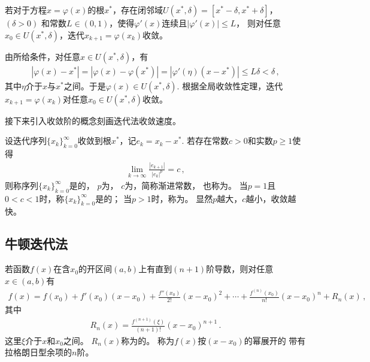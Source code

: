 \begin{theorem}[局部收敛性定理]
    若对于方程$x=\varphi(x)$的根$x^*$，存在闭邻域$U(x^*,\delta)=[x^*-\delta,x^*+\delta]$，$(\delta>0)$
    和常数$L\in(0,1)$，使得$\varphi'(x)$连续且$|\varphi'(x)|\le L$，
    则对任意$x_0\in U(x^*,\delta)$，迭代$x_{k+1}=\varphi(x_k)$收敛。
\end{theorem}
\begin{prove}
    由所给条件，对任意$x\in U(x^*,\delta)$，有
    \begin{align}\label{eq:02ex0323}
        |\varphi(x)-x^*|=|\varphi(x)-\varphi(x^*)|=|\varphi'(\eta)(x-x^*)|\le L\delta<\delta\, ,
    \end{align}
    其中$\eta$介于$x$与$x^*$之间。于是$\varphi(x)\in U(x^*,\delta)$.
    根据全局收敛性定理，迭代$x_{k+1}=\varphi(x_k)$对任意$x_0\in U(x^*,\delta)$收敛。
\end{prove}

接下来引入收敛阶的概念刻画迭代法收敛速度。
\begin{definition}
    设迭代序列$\{x_k\}_{k=0}^\infty$收敛到根$x^*$，记$e_k=x_k-x^*$.
    若存在常数$c>0$和实数$p\ge1$使得
    \begin{align}\label{eq:02ex0324}
        \lim\limits_{k\rightarrow\infty}{\frac{|e_{k+1}|}{|e_k|^p}}=c\, ,
    \end{align}
    则称序列$\{x_k\}_{k=0}^\infty$是的，
    $p$为，
    $c$为，简称渐进常数，
    也称为。
    当$p=1$且$0<c<1$时，称$\{x_k\}_{k=0}^\infty$是的；
    当$p>1$时，称为。
    显然$p$越大，$c$越小，收敛越快。
\end{definition}

\subsection{牛顿迭代法}\label{sub:牛顿迭代法}
\begin{theorem}
    若函数$f(x)$在含$x_0$的开区间$(a,b)$上有直到$(n+1)$阶导数，则对任意$x\in(a,b)$有
    \begin{align}\label{eq:02ex0325.1}
        f(x)=f(x_0)+f'(x_0)(x-x_0)+\frac{f''(x_0)}{2!}(x-x_0)^2+\cdots+\frac{f^{(n)}(x_0)}{n!}(x-x_0)^n+R_n(x)\, ,
    \end{align}
    其中
    \begin{align}\label{eq:02ex0325.2}
        R_n(x)=\frac{f^{(n+1)}(\xi)}{(n+1)!}(x-x_0)^{n+1}\, .
    \end{align}
    这里$\xi$介于$x$和$x_0$之间。
    $R_n(x)$称为的。
    称为$f(x)$按$(x-x_0)$的幂展开的
    带有拉格朗日型余项的$n$阶。
\end{theorem}

